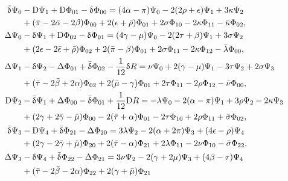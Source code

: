 \begin{subequations}\label{chnull:eqn_Bianchi-4Q}
    \begin{align}
        \bar{\updelta }\Psi _{0}&-{\rm D}\Psi _{1} +{\rm D} \Phi_{01} -\updelta \Phi_{00}
        =(4\alpha -\pi )\Psi _{0}-2(2\rho +\epsilon )\Psi _{1} +3\kappa \Psi _{2} \notag \\
        &+(\bar{\pi}-2\bar{\alpha}-2\beta)\Phi_{00} + 2(\epsilon+\bar{\rho})\Phi_{01}
        +2\sigma\Phi_{10} - 2\kappa \Phi_{11} -\bar{\kappa}\Phi_{02}, \\
        \Delta \Psi_{0}&-\updelta \Psi_{1} + {\rm D} \Phi_{02} -\updelta \Phi_{01}
        =(4\gamma -\mu )\Psi_{0}-2(2\tau +\beta )\Psi _{1} +3\sigma \Psi _{2} \notag\\
        &+(2\epsilon -2\bar{\epsilon}+\bar{\rho}) \Phi_{02} + 2(\bar{\pi}-\beta)\Phi_{01}
        +2\sigma \Phi_{11} -2 \kappa \Phi_{12} -\bar{\lambda}\Phi_{00}, \\
        \Delta \Psi_{1}&-\updelta \Psi_{2} - {\Delta} \Phi_{01} + \bar{\updelta} \Phi_{02}
        -\frac{1}{12}{\updelta}R = \nu \Psi_{0} + 2(\gamma -\mu )\Psi_{1}
        -3\tau \Psi_{2} + 2\sigma \Psi _{3} \notag\\
        & + (\bar{\tau}-2\bar{\beta}+2\alpha)\Phi_{02} + 2(\bar{\mu}-\gamma)\Phi_{01}
        +2\tau\Phi_{11} - 2\rho\Phi_{12} -\bar{\nu}\Phi_{00}, \\
        {\rm D}\Psi _{2} &-\bar{\updelta }\Psi _{1}  +{\Delta} \Phi_{00} -\bar{\updelta} \Phi_{01}
        +\frac{1}{12}{\rm D}R = -\lambda \Psi _{0} - 2(\alpha -\pi )\Psi _{1}
        +3\rho \Psi _{2}-2\kappa \Psi _{3} \notag\\
        &+(2\gamma+2\bar{\gamma}-\bar{\mu})\Phi_{00} - 2(\bar{\tau}+\alpha)\Phi_{01}
        -2\tau \Phi_{10} + 2\rho\Phi_{11} +\bar{\sigma}\Phi_{02}, \\
        \bar{\updelta }\Psi_{3}&-{\rm D}\Psi_{4}  +\bar{\updelta} \Phi_{21} -\Delta \Phi_{20}
        =3\lambda \Psi _{2}-2(\alpha +2\pi)\Psi _{3}+(4\epsilon -\rho )\Psi _{4} \notag\\
        &+(2\gamma-2\bar{\gamma}+\bar{\mu})\Phi_{20} +2(\bar{\tau}-\alpha)\Phi_{21}
        +2\lambda\Phi_{11}-2\nu\Phi_{10}-\bar{\sigma}\Phi_{22}, \\
        \Delta \Psi_{3}&-\updelta \Psi _{4}  +\bar{\updelta} \Phi_{22} - {\Delta} \Phi_{21}
        =3\nu \Psi _{2}-2(\gamma +2\mu )\Psi_{3}+(4\beta -\tau )\Psi _{4} \notag\\
        &+(\bar{\tau}-2\bar{\beta}-2\alpha)\Phi_{22}+2(\gamma+\bar{\mu})\Phi_{21}

\end{align}
\end{subequations}
